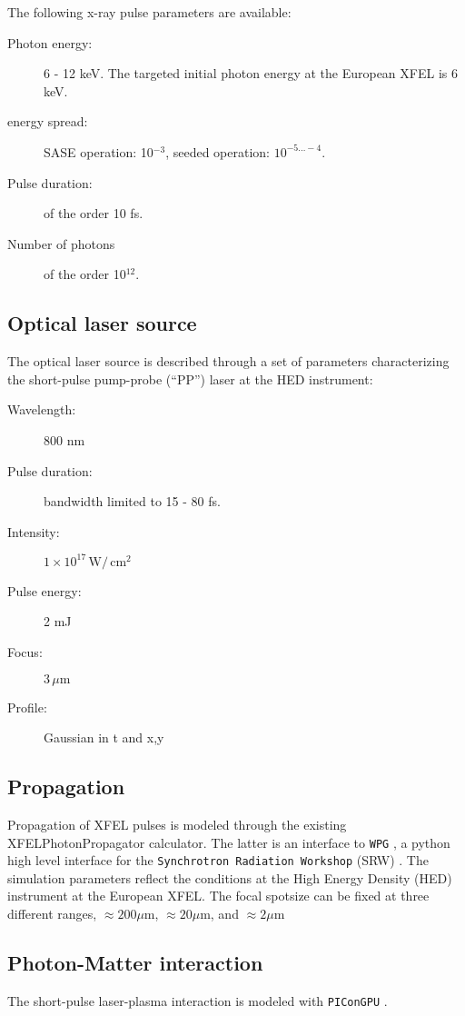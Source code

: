 \documentclass[a4paper]{article}
\begin{document}
The following x-ray pulse parameters are available:
\begin{description}
  \item[Photon energy:] 6 - 12 keV. The targeted initial photon energy at the European XFEL is 6 keV.
  \item[energy spread:] SASE operation: 10$^{-3}$, seeded operation: $10^{-5\dots-4}$.
  \item[Pulse duration:] of the order 10 fs.
  \item[Number of photons] of the order 10$^{12}$.
\end{description}
%
\subsection{Optical laser source}
The optical laser source is described through a set of parameters characterizing the short-pulse pump-probe (``PP'') laser at the HED
instrument:
\begin{description}
  \item[Wavelength:] 800 nm
  \item[Pulse duration:] bandwidth limited to 15 - 80 fs.
  \item[Intensity:] $1\times 10^{17}\,\text{W}/\,\text{cm}^2$
  \item[Pulse energy:] 2 mJ
  \item[Focus:] $3\,\mu\text{m}$
  \item[Profile:] Gaussian in t and x,y
\end{description}
%
\subsection{Propagation\label{sec:short_pulse_prop}}
Propagation of XFEL pulses is modeled through the existing XFELPhotonPropagator calculator. The latter is an interface
to \texttt{WPG} \cite{Samoylova2016_submitted, wpg_github}, a python high level interface for the \texttt{Synchrotron Radiation Workshop} (SRW) \cite{Chubar2008, srw_github}.
The simulation parameters reflect the conditions at the High Energy Density (HED) instrument \cite{Nakatsutsumi2014}
at the European XFEL. The focal spotsize can be fixed at three different ranges,
$\approx 200 \mu\text{m}$, $\approx 20 \mu\text{m}$, and $\approx 2 \mu\text{m}$ 
%
\subsection{Photon-Matter interaction}
The short-pulse laser-plasma interaction is modeled with \texttt{PIConGPU} \cite{Bussmann2013}.
\end{document}
